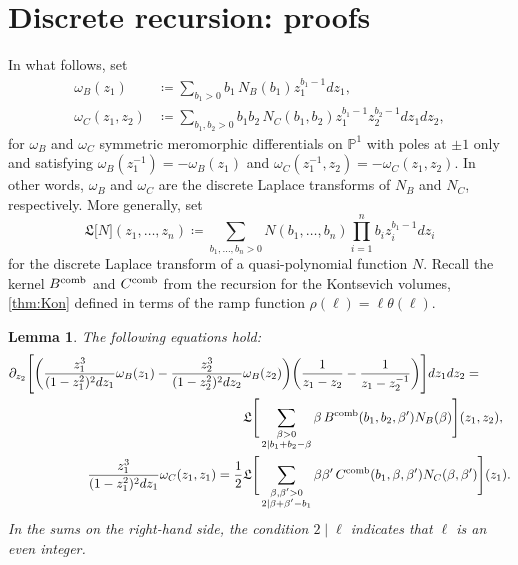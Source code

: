 \documentclass[a4paper,11pt,english]{article}
\theoremstyle{plain}
\newtheorem{lemma}[theorem]{Lemma}
\theoremstyle{definition}
\theoremstyle{plain}
\newcommand{\de}{\partial}
\renewcommand{\P}{\mathbb{P}}
\begin{document}
\section{Discrete recursion: proofs} \label{app:proofsRecRel}
In what follows, set
\begin{equation}\label{eq:Laplace:WB:WC}
\begin{aligned}
	\omega_B(z_1)
	&\coloneqq
	\sum_{b_1 > 0} b_1 \, N_B(b_1) z_1^{b_1-1} dz_1, \\
	\omega_C(z_1,z_2)
	&\coloneqq
	\sum_{b_1,b_2 > 0} b_1 b_2 \, N_C(b_1,b_2) z_1^{b_1-1} z_2^{b_2-1} dz_1 dz_2,
\end{aligned}
\end{equation}
for $\omega_B$ and $\omega_C$ symmetric meromorphic differentials on $\P^1$ with poles at $\pm 1$ only and satisfying $\omega_B(z_1^{-1}) = - \omega_B(z_1)$ and $\omega_C(z_1^{-1},z_2) = - \omega_C(z_1,z_2)$.
In other words, $\omega_B$ and $\omega_C$ are the discrete Laplace transforms of $N_B$ and $N_C$, respectively.
More generally, set
\begin{equation}
	\mathfrak{L}\bigl[ N \bigr](z_1,\ldots,z_n)
	\coloneqq
	\sum_{b_1,\ldots,b_n > 0} N(b_1,\ldots,b_n) \prod_{i=1}^n b_i z_i^{b_1 -1} dz_i
\end{equation}
for the discrete Laplace transform of a quasi-polynomial function $N$. Recall the kernel $B^{\textup{comb}}$ and $C^{\textup{comb}}$ from the recursion for the Kontsevich volumes, \cref{thm:Kon} defined in terms of the ramp function $\rho(\ell) = \ell \theta(\ell)$.

\begin{lemma}\label{lem:GUE}
	The following equations hold:
	\begin{align}
		\notag
		\de_{z_2}
		\Bigg[
			\bigg(
				\frac{z_1^3}{(1 - z_1^2)^2 dz_1} \omega_B(z_1)
				-
				\frac{z_2^3}{(1 - z_2^2)^2 dz_2} & \omega_B(z_2)
			\bigg)
			\bigg(
				\frac{1}{z_1 - z_2}
				-
				\frac{1}{z_1 - z_2^{-1}}
			\bigg)
		\Bigg] dz_1 dz_2
		= \\
		\label{eq:B0}
		&
		\mathfrak{L}\Bigg[
			\sum_{\substack{\beta > 0 \\ 2 \mid b_1 + b_2 - \beta}} \beta \, B^{\textup{comb}}(b_1,b_2,\beta') N_B(\beta) 
		\Bigg](z_1,z_2),
		\\
		\label{eq:C0}
		\frac{z_1^3}{(1-z_1^2)^2 dz_1} \omega_C(z_1,z_1)
		=
		\frac{1}{2}
		&
		\mathfrak{L}\Bigg[
			\sum_{\substack{\beta,\beta' > 0 \\ 2 \mid \beta + \beta' - b_1}} \beta \beta' \, C^{\textup{comb}}(b_1,\beta,\beta') N_C(\beta,\beta') 
		\Bigg](z_1).
	\end{align}
	In the sums on the right-hand side, the condition $2 \mid \ell$ indicates that $\ell$ is an even integer.
\end{lemma}
\end{document}
